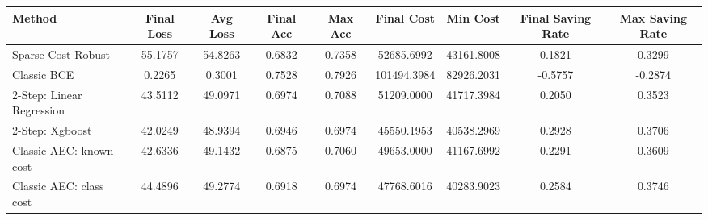 \begin{tabular}{lcccccccc}
\toprule
Method & Final Loss & Avg Loss & Final Acc & Max Acc & Final Cost & Min Cost & Final Saving Rate & Max Saving Rate \\
\midrule
Sparse-Cost-Robust & 55.1757 & 54.8263 & 0.6832 & 0.7358 & 52685.6992 & 43161.8008 & 0.1821 & 0.3299 \\
Classic BCE & 0.2265 & 0.3001 & 0.7528 & 0.7926 & 101494.3984 & 82926.2031 & -0.5757 & -0.2874 \\
2-Step: Linear Regression & 43.5112 & 49.0971 & 0.6974 & 0.7088 & 51209.0000 & 41717.3984 & 0.2050 & 0.3523 \\
2-Step: Xgboost & 42.0249 & 48.9394 & 0.6946 & 0.6974 & 45550.1953 & 40538.2969 & 0.2928 & 0.3706 \\
Classic AEC: known cost & 42.6336 & 49.1432 & 0.6875 & 0.7060 & 49653.0000 & 41167.6992 & 0.2291 & 0.3609 \\
Classic AEC: class cost & 44.4896 & 49.2774 & 0.6918 & 0.6974 & 47768.6016 & 40283.9023 & 0.2584 & 0.3746 \\
\bottomrule
\end{tabular}
